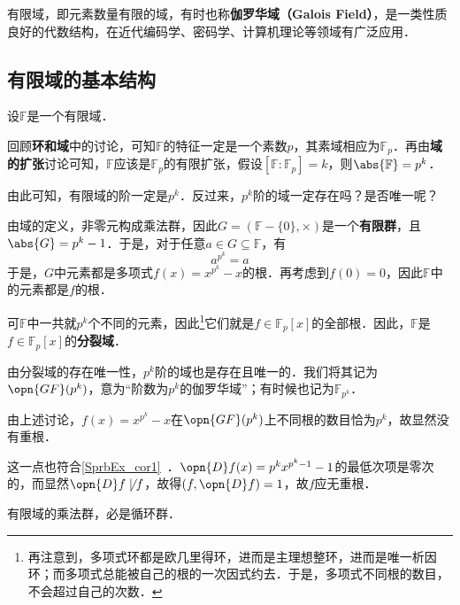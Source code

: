 


有限域，即元素数量有限的域，有时也称\textbf{伽罗华域（Galois Field）}，是一类性质良好的代数结构，在近代编码学、密码学、计算机理论等领域有广泛应用．

\subsection{有限域的基本结构}

设$\mathbb{F}$是一个有限域．

回顾\textbf{环和域}中的讨论，可知$\mathbb{F}$的特征一定是一个素数$p$，其素域相应为$\mathbb{F}_p$．再由\textbf{域的扩张}讨论可知，$\mathbb{F}$应该是$\mathbb{F}_p$的有限扩张，假设$[\mathbb{F}:\mathbb{F}_p]=k$，则$\abs{\mathbb{F}}=p^k$．

由此可知，有限域的阶一定是$p^k$．反过来，$p^k$阶的域一定存在吗？是否唯一呢？

由域的定义，非零元构成乘法群，因此$G=(\mathbb{F}-\{0\}, \times)$是一个\textbf{有限群}，且$\abs{G}=p^k-1$．于是，对于任意$a\in G\subseteq\mathbb{F}$，有
\begin{equation}
a^{p^k}=a
\end{equation}
于是，$G$中元素都是多项式$f(x)=x^{p^k}-x$的根．再考虑到$f(0)=0$，因此$\mathbb{F}$中的元素都是$f$的根．

可$\mathbb{F}$中一共就$p^k$个不同的元素，因此\footnote{再注意到，多项式环都是欧几里得环，进而是主理想整环，进而是唯一析因环；而多项式总能被自己的根的一次因式约去．于是，多项式不同根的数目，不会超过自己的次数．}它们就是$f\in\mathbb{F}_p[x]$的全部根．因此，$\mathbb{F}$是$f\in\mathbb{F}_p[x]$的\textbf{分裂域}．

由分裂域的存在唯一性，$p^k$阶的域也是存在且唯一的．我们将其记为$\opn{GF}(p^k)$，意为“阶数为$p^k$的伽罗华域”；有时候也记为$\mathbb{F}_{p^k}$．

\begin{example}{}
由上述讨论，$f(x)=x^{p^k}-x$在$\opn{GF}(p^k)$上不同根的数目恰为$p^k$，故显然没有重根．

这一点也符合\autoref{SprbEx_cor1}~．$\opn{D}f(x)=p^kx^{p^k-1}-1$的最低次项是零次的，而显然$\opn{D}f\not\mid f$，故得$(f, \opn{D}f)=1$，故$f$应无重根．
\end{example}


\begin{theorem}{}\label{FntFld_the1}
有限域的乘法群，必是循环群．
\end{theorem}

